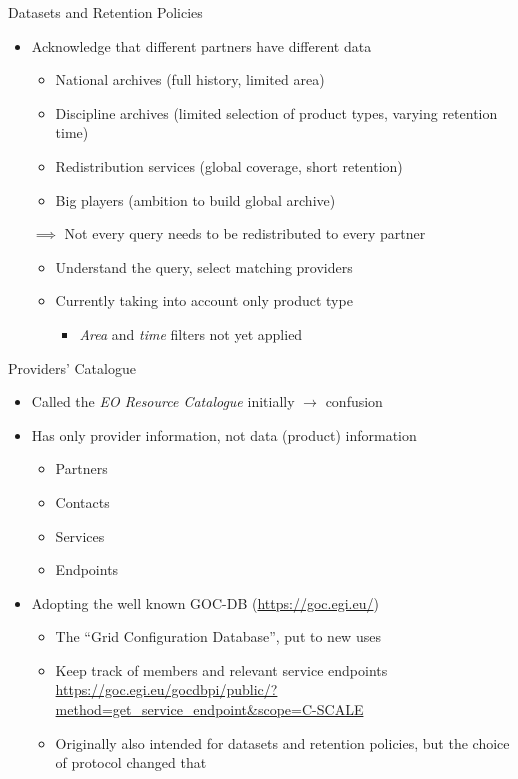 \documentclass[c,aspectratio=169,14pt]{beamer}
\begin{document}
\begin{frame}{Datasets and Retention Policies}

\begin{itemize}
\item Acknowledge that different partners have different data
\begin{itemize}
\item National archives (full history, limited area)
\item Discipline archives (limited selection of product types, varying retention time)
\item Redistribution services (global coverage, short retention)
\item Big players (ambition to build global archive)
\end{itemize}
\item[$\implies$] Not every query needs to be redistributed to every partner
\begin{itemize}
\item Understand the query, select matching providers
\item Currently taking into account only product type
\begin{itemize}
\item \textit{Area} and \textit{time} filters not yet applied
\end{itemize}
\end{itemize}
\end{itemize}

\end{frame}



\begin{frame}{Providers' Catalogue}
\begin{itemize}
\item Called the \textit{EO Resource Catalogue} initially $\rightarrow$ confusion
\item Has \alert{only} provider information, not data (product) information
\begin{itemize}
\item Partners
\item Contacts
\item Services
\item Endpoints
\end{itemize}
\item Adopting the well known GOC-DB (\url{https://goc.egi.eu/})
\begin{itemize}
\item The ``Grid Configuration Database'', put to new uses
\item Keep track of members and relevant service endpoints\\{\scriptsize\url{https://goc.egi.eu/gocdbpi/public/?method=get_service_endpoint&scope=C-SCALE}}
\item Originally also intended for datasets and retention policies, but the choice of protocol changed that
\end{itemize}
\end{itemize}
\end{frame}
\end{document}
